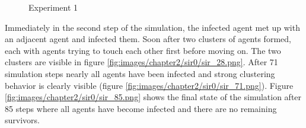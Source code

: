 \begin{figure}[H]
    \centering
    \hspace*{\fill}

    \hspace*{\fill}

    \caption{Experiment 1} \label{fig:experiment0}
\end{figure}

Immediately in the second step of the simulation, the infected agent met up with an adjacent agent and infected them.
Soon after two clusters of agents formed, each with agents trying to touch each other first before moving on.
The two clusters are visible in figure \ref{fig:images/chapter2/sir0/sir_28.png}.
After 71 simulation steps nearly all agents have been infected and strong clustering behavior is clearly visible (figure \ref{fig:images/chapter2/sir0/sir_71.png}).
Figure \ref{fig:images/chapter2/sir0/sir_85.png} shows the final state of the simulation after 85 steps where all agents have become infected and there are no remaining survivors.

